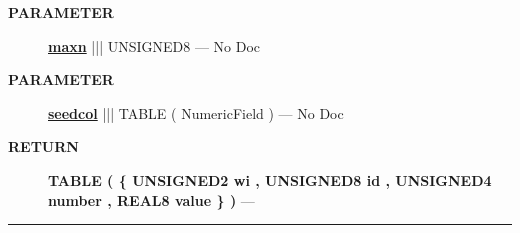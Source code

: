 \par
\begin{description}
\item [\colorbox{tagtype}{\color{white} \textbf{\textsf{PARAMETER}}}] \textbf{\underline{maxn}} ||| UNSIGNED8 --- No Doc
\item [\colorbox{tagtype}{\color{white} \textbf{\textsf{PARAMETER}}}] \textbf{\underline{seedcol}} ||| TABLE ( NumericField ) --- No Doc
\end{description}







\par
\begin{description}
\item [\colorbox{tagtype}{\color{white} \textbf{\textsf{RETURN}}}] \textbf{TABLE ( \{ UNSIGNED2 wi , UNSIGNED8 id , UNSIGNED4 number , REAL8 value \} )} --- 
\end{description}




\rule{\linewidth}{0.5pt}


